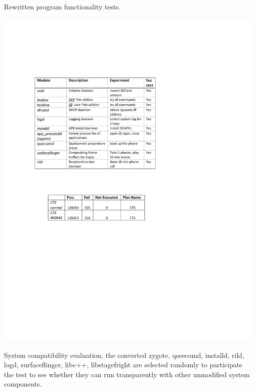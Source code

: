 \begin{table}[h]
	\centering
	\begin{minipage}[b]{0.45\textwidth}
		\centering	
		\caption{Rewritten program functionality tests.}
		\label{tab:eval-intro}
		\includegraphics[scale=0.76]{norax/figures/realworld-task}
	\end{minipage}
 	\hfill
	\begin{minipage}[b]{0.5\textwidth}
		\centering	
		\caption{System compatibility evaluation, the converted zygote, qseecomd, installd, rild, logd, surfaceflinger, libc++, libstagefright are selected randomly to participate the test to see whether they can run transparently with other unmodified system components.}
		\label{tab:cts}

\end{minipage}
\end{table}
